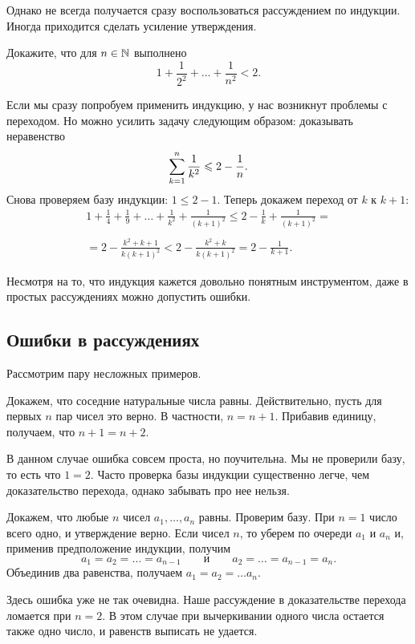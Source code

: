 Однако не всегда получается сразу воспользоваться рассуждением по
индукции. Иногда приходится сделать усиление утверждения.
\begin{task}
    Докажите, что для $n \in \mathbb{N}$ выполнено
    \[
        1 + \frac1{2^2} + \ldots + \frac1{n^2} < 2.
        \]
\end{task}
Если мы сразу попробуем применить индукцию, у нас возникнут проблемы
с переходом. Но можно усилить задачу следующим образом: доказывать
неравенство
\[
    \sum\limits_{k=1}^n \frac1{k^2} \leqslant 2 - \frac1n.
    \]
Снова проверяем базу индукции: $1 \leqslant 2 - 1$. Теперь докажем
переход от $k$ к $k+1$:
\begin{multline*}
    1 + \frac14 + \frac19 + \ldots + \frac1{k^2} + \frac1{(k+1)^2} 
    \leqslant 2 - \frac1k + \frac1{(k+1)^2} =\\\\=2 - \frac{k^2 + k + 
    1}{k(k+1)^2} < 2 - \frac{k^2 + k}{k(k+1)^2} = 2 - \frac1{k+1}.
\end{multline*}

Несмотря на то, что индукция кажется довольно понятным инструментом,
даже в простых рассуждениях можно допустить ошибки.

\subsection{Ошибки в рассуждениях}
Рассмотрим пару несложных примеров.
\begin{example}
    Докажем, что соседние натуральные числа равны. Действительно, 
    пусть для первых $n$ пар чисел это верно. В частности, $n = n + 1$.
    Прибавив единицу, получаем, что $n+1 = n+2$. 
\end{example}
В данном случае ошибка совсем проста, но поучительна. Мы не проверили
базу, то есть что $1 = 2$. Часто проверка базы индукции существенно
легче, чем доказательство перехода, однако забывать про нее нельзя.

\begin{example}
    Докажем, что любые $n$ чисел $a_1, \ldots, a_n$ равны. Проверим
    базу. При $n = 1$ число всего одно, и утверждение верно. Если
    чисел $n$, то уберем по очереди $a_1$ и $a_n$ и, применив
    предположение индукции, получим
    \[
        a_1 = a_2 = \ldots = a_{n-1} \qquad \text{и} \qquad
        a_2 = \ldots = a_{n-1} = a_n.
        \]
    Объединив два равенства, получаем $a_1 = a_2 = \ldots a_n$.
\end{example}
Здесь ошибка уже не так очевидна. Наше рассуждение в доказательстве
перехода ломается при $n=2$. В этом случае при вычеркивании одного
числа остается также одно число, и равенств выписать не удается.
